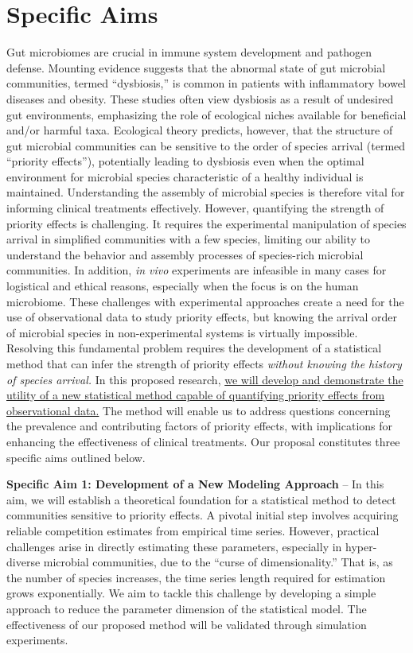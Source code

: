 \documentclass[12pt, class=article, crop=false]{standalone}
\begin{document}
\section*{Specific Aims}

Gut microbiomes are crucial in immune system development and pathogen defense.
Mounting evidence suggests that the abnormal state of gut microbial communities, termed ``dysbiosis,'' is common in patients with inflammatory bowel diseases and obesity.
These studies often view dysbiosis as a result of undesired gut environments, emphasizing the role of ecological niches available for beneficial and/or harmful taxa.
Ecological theory predicts, however, that the structure of gut microbial communities can be sensitive to the order of species arrival (termed ``priority effects''), potentially leading to dysbiosis even when the optimal environment for microbial species characteristic of a healthy individual is maintained.
Understanding the assembly of microbial species is therefore vital for informing clinical treatments effectively.
However, quantifying the strength of priority effects is challenging.
It requires the experimental manipulation of species arrival in simplified communities with a few species, limiting our ability to understand the behavior and assembly processes of species-rich microbial communities.
In addition, \textit{in vivo} experiments are infeasible in many cases for logistical and ethical reasons, especially when the focus is on the human microbiome.
These challenges with experimental approaches create a need for the use of observational data to study priority effects, but knowing the arrival order of microbial species in non-experimental systems is virtually impossible.
Resolving this fundamental problem requires the development of a statistical method that can infer the strength of priority effects \textit{without knowing the history of species arrival.}
In this proposed research, \ul{we will develop and demonstrate the utility of a new statistical method capable of quantifying priority effects from observational data.}
The method will enable us to address questions concerning the prevalence and contributing factors of priority effects, with implications for enhancing the effectiveness of clinical treatments.
Our proposal constitutes three specific aims outlined below.

\textbf{Specific Aim 1: Development of a New Modeling Approach} --
In this aim, we will establish a theoretical foundation for a statistical method to detect communities sensitive to priority effects.
A pivotal initial step involves acquiring reliable competition estimates from empirical time series. However, practical challenges arise in directly estimating these parameters, especially in hyper-diverse microbial communities, due to the ``curse of dimensionality.''
That is, as the number of species increases, the time series length required for estimation grows exponentially.
We aim to tackle this challenge by developing a simple approach to reduce the parameter dimension of the statistical model.
The effectiveness of our proposed method will be validated through simulation experiments.
\end{document}
